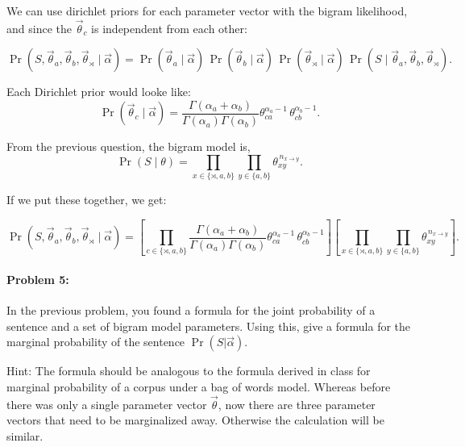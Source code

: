 \documentclass[10pt]{article}
\newenvironment{AnswerBox}{\begin{mdframed}[style=simple]}{\end{mdframed}}
\begin{document}
\begin{AnswerBox}%

    We can use dirichlet priors for each parameter vector with the bigram likelihood, and since the $\vec\theta_c$ is independent from each other:
    
    \[
    \Pr(S,\vec\theta_a,\vec\theta_b,\vec\theta_{\rtimes}\mid\vec\alpha)
    = \Pr(\vec\theta_a\mid\vec\alpha)\,
    \Pr(\vec\theta_b\mid\vec\alpha)\,
    \Pr(\vec\theta_{\rtimes}\mid\vec\alpha)\,
    \Pr(S\mid\vec\theta_a,\vec\theta_b,\vec\theta_{\rtimes}).
    \]

    Each Dirichlet prior would looke like:
        \[
    \Pr(\vec\theta_c\mid\vec\alpha)
    = \frac{\Gamma(\alpha_a+\alpha_b)} {\Gamma(\alpha_a)\Gamma(\alpha_b)}
    \theta_{ca}^{\alpha_a-1}\, \theta_{cb}^{\alpha_b-1}.
    \]
    
    From the previous question, the bigram model is,
    \[
    \Pr(S\mid\theta)
    = \prod_{x\in\{\rtimes,a,b\}}
    \prod_{y\in\{a,b\}}
    \theta_{xy}^{\,n_{x\to y}}.
    \]
    
    If we put these together, we get:
    
    \[
    \Pr(S,\vec\theta_a,\vec\theta_b,\vec\theta_{\rtimes}\mid\vec\alpha)
    = \left[ \prod_{c\in\{\rtimes,a,b\}}
    \frac{\Gamma(\alpha_a+\alpha_b)} {\Gamma(\alpha_a)\Gamma(\alpha_b)}
    \theta_{ca}^{\alpha_a-1}\, \theta_{cb}^{\alpha_b-1} \right]
    \left[ \prod_{x\in\{\rtimes,a,b\}}
    \prod_{y\in\{a,b\}}
    \theta_{xy}^{\,n_{x\to y}} \right].
    \]
    
\end{AnswerBox}%


\hrulefill %

\paragraph{Problem 5:}

In the previous problem, you found a formula for the joint probability
of a sentence and a set of bigram model parameters. Using this, give a
formula for the marginal probability of the sentence
$\Pr(S|\vec{\alpha})$.

 Hint: The formula should be analogous to the formula derived
in class for marginal probability of a corpus under a bag of words
model. Whereas before there was only a single parameter vector
$\vec{\theta}$, now there are three parameter vectors that need to be
marginalized away. Otherwise the calculation will be similar.
\end{document}
